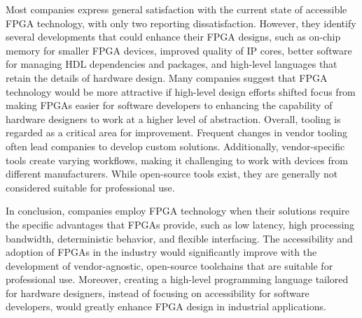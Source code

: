 Most companies express general satisfaction with the current state of accessible FPGA technology, with only two reporting dissatisfaction. However, they identify several developments that could enhance their FPGA designs, such as on-chip memory for smaller FPGA devices, improved quality of IP cores, better software for managing HDL dependencies and packages, and high-level languages that retain the details of hardware design. Many companies suggest that FPGA technology would be more attractive if high-level design efforts shifted focus from making FPGAs easier for software developers to enhancing the capability of hardware designers to work at a higher level of abstraction. Overall, tooling is regarded as a critical area for improvement. Frequent changes in vendor tooling often lead companies to develop custom solutions. Additionally, vendor-specific tools create varying workflows, making it challenging to work with devices from different manufacturers. While open-source tools exist, they are generally not considered suitable for professional use.





In conclusion, companies employ FPGA technology when their solutions require the specific advantages that FPGAs provide, such as low latency, high processing bandwidth, deterministic behavior, and flexible interfacing. The accessibility and adoption of FPGAs in the industry would significantly improve with the development of vendor-agnostic, open-source toolchains that are suitable for professional use. Moreover, creating a high-level programming language tailored for hardware designers, instead of focusing on accessibility for software developers, would greatly enhance FPGA design in industrial applications.